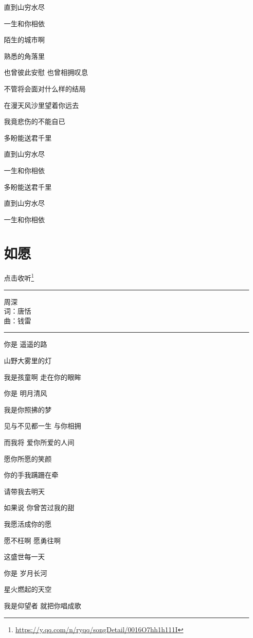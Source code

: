 \documentclass[]{ctexbook}
\renewcommand{\href}[2]{#2\footnote{\url{#1}}}
\begin{document}
直到山穷水尽

一生和你相依

陌生的城市啊

熟悉的角落里

也曾彼此安慰 也曾相拥叹息

不管将会面对什么样的结局

在漫天风沙里望着你远去

我竟悲伤的不能自已

多盼能送君千里

直到山穷水尽

一生和你相依

多盼能送君千里

直到山穷水尽

一生和你相依

\section*{如愿}\label{As-you-wish}


\href{https://y.qq.com/n/ryqq/songDetail/0016O7hh1h111I}{点击收听}

\begin{center}\rule{0.5\linewidth}{0.5pt}\end{center}

周深\\
词：唐恬\\
曲：钱雷

\begin{center}\rule{0.5\linewidth}{0.5pt}\end{center}

你是 遥遥的路

山野大雾里的灯

我是孩童啊 走在你的眼眸

你是 明月清风

我是你照拂的梦

见与不见都一生 与你相拥

而我将 爱你所爱的人间

愿你所愿的笑颜

你的手我蹒跚在牵

请带我去明天

如果说 你曾苦过我的甜

我愿活成你的愿

愿不枉啊 愿勇往啊

这盛世每一天

你是 岁月长河

星火燃起的天空

我是仰望者 就把你唱成歌
\end{document}
